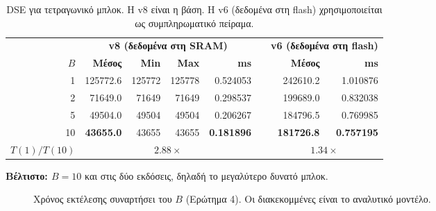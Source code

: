 \documentclass[11pt,a4paper]{article}
\begin{document}
\begin{table}[H]
\centering
\caption{DSE για τετραγωνικό μπλοκ. Η v8 είναι η βάση. Η v6 (δεδομένα στη flash) χρησιμοποιείται ως συμπληρωματικό πείραμα.}
\label{tab:dse_b}
\small
\begin{tabular}{@{}r rrrr c rr@{}}
\toprule
 & \multicolumn{4}{c}{\textbf{v8 (δεδομένα στη SRAM)}} & & \multicolumn{2}{c}{\textbf{v6 (δεδομένα στη flash)}} \\
\cmidrule(lr){2-5}\cmidrule(lr){7-8}
$B$ & \textbf{Μέσος} & \textbf{Min} & \textbf{Max} & \textbf{ms} & & \textbf{Μέσος} & \textbf{ms} \\
\midrule
1  & \num{125772.6} & \num{125772} & \num{125778} & \num{0.524053} & & \num{242610.2} & \num{1.010876} \\
2  & \num{71649.0}  & \num{71649}  & \num{71649}  & \num{0.298537} & & \num{199689.0} & \num{0.832038} \\
5  & \num{49504.0}  & \num{49504}  & \num{49504}  & \num{0.206267} & & \num{184796.5} & \num{0.769985} \\
10 & \textbf{\num{43655.0}} & \num{43655} & \num{43655} & \textbf{\num{0.181896}} & & \textbf{\num{181726.8}} & \textbf{\num{0.757195}} \\
\midrule
$T(1)/T(10)$ & \multicolumn{4}{c}{$2.88\times$} & & \multicolumn{2}{c}{$1.34\times$} \\
\bottomrule
\end{tabular}
\end{table}

\noindent\textbf{Βέλτιστο: $B=10$} και στις δύο εκδόσεις, δηλαδή το μεγαλύτερο δυνατό μπλοκ.

\begin{figure}[H]
\centering
{}
\caption{Χρόνος εκτέλεσης συναρτήσει του $B$ (Ερώτημα 4). Οι διακεκομμένες είναι το αναλυτικό μοντέλο.}
\label{fig:dse_b}
\end{figure}
\end{document}
